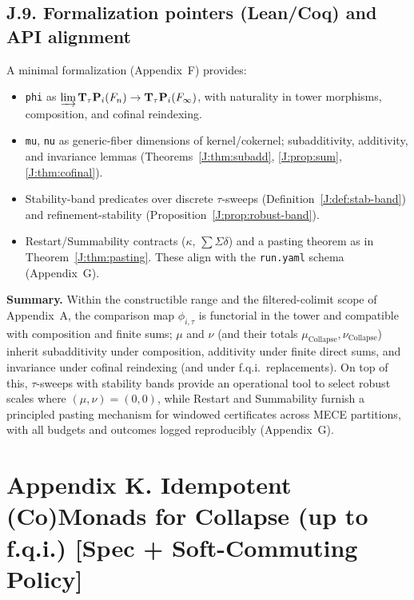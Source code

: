 \documentclass[11pt]{article}
\numberwithin{equation}{section}
\theoremstyle{definition}
\DeclareRobustCommand{\muc}{\mu_{\mathrm{Collapse}}}
\DeclareRobustCommand{\nuc}{\nu_{\mathrm{Collapse}}}
\begin{document}
\subsection*{J.9. Formalization pointers (Lean/Coq) and API alignment}
A minimal formalization (Appendix~F) provides:
\begin{itemize}\itemsep0.25em
  \item \texttt{phi} as \(\varinjlim \mathbf{T}_\tau\mathbf{P}_i(F_n)\to \mathbf{T}_\tau\mathbf{P}_i(F_\infty)\), with naturality in tower morphisms, composition, and cofinal reindexing.
  \item \texttt{mu}, \texttt{nu} as generic-fiber dimensions of kernel/cokernel; subadditivity, additivity, and invariance lemmas (Theorems~\ref{J:thm:subadd}, \ref{J:prop:sum}, \ref{J:thm:cofinal}).
  \item Stability-band predicates over discrete \(\tau\)-sweeps (Definition~\ref{J:def:stab-band}) and refinement-stability (Proposition~\ref{J:prop:robust-band}).
  \item Restart/Summability contracts (\(\kappa\), \(\sum\Sigma\delta\)) and a pasting theorem as in Theorem~\ref{J:thm:pasting}. These align with the \texttt{run.yaml} schema (Appendix~G).
\end{itemize}

\medskip
\noindent\textbf{Summary.}
Within the constructible range and the filtered-colimit scope of Appendix~A, the comparison map \(\phi_{i,\tau}\) is functorial in the tower and compatible with composition and finite sums; \(\mu\) and \(\nu\) (and their totals \(\muc,\nuc\)) inherit subadditivity under composition, additivity under finite direct sums, and invariance under cofinal reindexing (and under f.q.i.\ replacements).
On top of this, \(\tau\)-sweeps with stability bands provide an operational tool to select robust scales where \((\mu,\nu)=(0,0)\), while Restart and Summability furnish a principled pasting mechanism for windowed certificates across MECE partitions, with all budgets and outcomes logged reproducibly (Appendix~G).



\section*{Appendix K. Idempotent (Co)Monads for Collapse (up to f.q.i.) [Spec + Soft-Commuting Policy]}
\label{K:monads}
\end{document}
